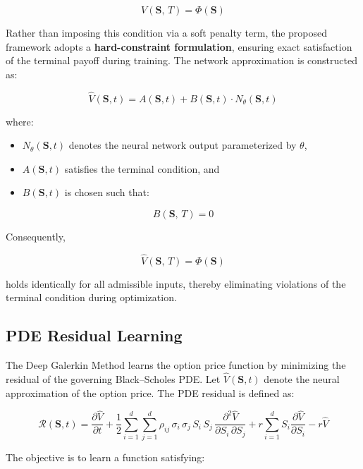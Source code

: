 \documentclass[12pt, a4paper]{article}
\begin{document}
\[
    V(\mathbf{S},\,T) = \Phi(\mathbf{S})
\]

Rather than imposing this condition via a soft penalty term, the
proposed framework adopts a \textbf{hard-constraint formulation},
ensuring exact satisfaction of the terminal payoff during training. The
network approximation is constructed as:

\begin{equation}
    \hat{V}(\mathbf{S},t) = A(\mathbf{S},t) + B(\mathbf{S},t)\cdot N_\theta(\mathbf{S},t)
    \label{eq:hard_constraint}
\end{equation}

where:
\begin{itemize}
    \item $N_\theta(\mathbf{S},t)$ denotes the neural network output
          parameterized by $\theta$,
    \item $A(\mathbf{S},t)$ satisfies the terminal condition, and
    \item $B(\mathbf{S},t)$ is chosen such that:
\end{itemize}

\[
    B(\mathbf{S},\,T) = 0
\]

Consequently,

\[
    \hat{V}(\mathbf{S},\,T) = \Phi(\mathbf{S})
\]

holds identically for all admissible inputs, thereby eliminating
violations of the terminal condition during optimization.

\subsection{PDE Residual Learning}

The Deep Galerkin Method learns the option price function by minimizing
the residual of the governing Black--Scholes PDE. Let
$\hat{V}(\mathbf{S},t)$ denote the neural approximation of the option
price. The PDE residual is defined as:

\begin{equation}
    \mathcal{R}(\mathbf{S},t)
    = \frac{\partial\hat{V}}{\partial t}
    + \frac{1}{2}\sum_{i=1}^{d}\sum_{j=1}^{d}
      \rho_{ij}\,\sigma_i\,\sigma_j\,S_i\,S_j\,
      \frac{\partial^2\hat{V}}{\partial S_i\,\partial S_j}
    + r\sum_{i=1}^{d} S_i\frac{\partial\hat{V}}{\partial S_i}
    - r\hat{V}
    \label{eq:pde_residual}
\end{equation}

The objective is to learn a function satisfying:
\end{document}

